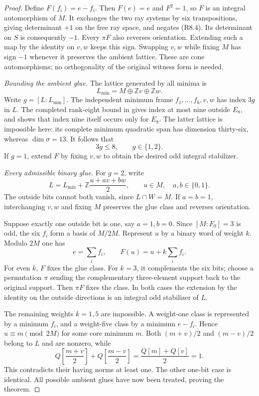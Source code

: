 \begin{proof}
Define $F(f_i)=e-f_i$. Then $F(e)=e$ and $F^2=1$, so $F$ is an
integral automorphism of $M$. It exchanges the two ray systems by
six transpositions, giving determinant $+1$ on the free ray space,
and negates (R8.4). Its determinant on $S$ is consequently $-1$.
Every $\pi F$ also reverses orientation. Extending such a map by
the identity on $v,w$ keeps this sign. Swapping $v,w$ while fixing
$M$ has sign $-1$ whenever it preserves the ambient lattice.
These are cone automorphisms; no orthogonality of the original
witness form is needed.

\medskip\noindent
\emph{Bounding the ambient glue.}
The lattice generated by all minima is
\[
                  L_{\min}=M\oplus\mathbb Zv\oplus\mathbb Zw.
\]
Write $g=[L:L_{\min}]$. The independent minimum frame
$f_1,\ldots,f_6,v,w$ has index $3g$ in $L$.
The completed rank-eight bound in
\cite[appendix, pp.~6--8]{MartinetIndexErrata2014} gives index at
most nine outside $E_8$, and
\cite[Theorem~10.1]{MartinetIndex2001} shows that index nine itself
occurs only for $E_8$. The latter lattice is impossible here: its
complete minimum quadratic span has dimension thirty-six, whereas
$\dim\sigma=13$. It follows that
\[
                           3g\leq8,
                  \qquad g\in\{1,2\}.                  \tag{R8.5}
\]
If $g=1$, extend $F$ by fixing $v,w$ to obtain the desired odd
integral stabilizer.

\medskip\noindent
\emph{Every admissible binary glue.}
For $g=2$, write
\[
 L=L_{\min}+\mathbb Z\frac{u+av+bw}{2},
       \qquad u\in M,\quad a,b\in\{0,1\}.
\]
The outside bits cannot both vanish, since $L\cap W=M$.
If $a=b=1$, interchanging $v,w$ and fixing $M$ preserves the
glue class and reverses orientation.

Suppose exactly one outside bit is one, say $a=1,b=0$.
Since $[M:F_0]=3$ is odd, the six $f_i$ form a basis of $M/2M$.
Represent $u$ by a binary word of weight $k$. Modulo $2M$ one has
\[
 e=\sum_i f_i,
 \qquad F(u)=u+k\sum_i f_i.
\]
For even $k$, $F$ fixes the glue class. For $k=3$, it complements
the six bits; choose a permutation $\pi$ sending the complementary
three-element support back to the original support. Then $\pi F$
fixes the class. In both cases the extension by the identity on the
outside directions is an integral odd stabilizer of $L$.

The remaining weights $k=1,5$ are impossible. A weight-one class
is represented by a minimum $f_i$, and a weight-five class by a
minimum $e-f_i$. Hence $u\equiv m\pmod{2M}$ for some core minimum
$m$. Both $(m+v)/2$ and $(m-v)/2$ belong to $L$ and are nonzero,
while
\[
 Q\!\left[\frac{m+v}{2}\right]
 +Q\!\left[\frac{m-v}{2}\right]
       =\frac{Q[m]+Q[v]}2=1.
\]
This contradicts their having norms at least one. The other
one-bit case is identical. All possible ambient glues have now
been treated, proving the theorem.
\end{proof}

